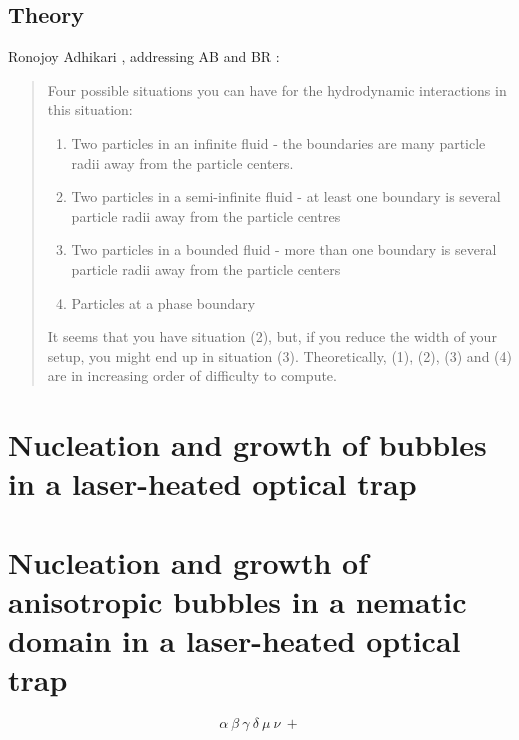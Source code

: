 \documentclass[a4paper, 11pt]{article}
\begin{document}
\subsection{Theory}

Ronojoy Adhikari , addressing AB and BR :

\begin{quotation}
  Four possible situations you can have for the hydrodynamic interactions in this situation:

  \begin{enumerate}
    \item Two particles in an infinite fluid - the boundaries are many particle radii away from the particle centers.
    \item Two particles in a semi-infinite fluid - at least one boundary is several particle radii away from the particle centres
    \item Two particles in a bounded fluid - more than one boundary is several particle radii away from the particle centers
    \item Particles at a phase boundary
  \end{enumerate}

It seems that you have situation (2), but, if you reduce the width of your setup, you might end up in situation (3). Theoretically, (1), (2), (3) and (4) are in increasing order of difficulty to compute. 
\end{quotation}


\newpage
\section{Nucleation and growth of bubbles in a laser-heated optical trap}

\section{Nucleation and growth of anisotropic bubbles in a nematic domain in a laser-heated optical trap}

\[ 
  \alpha ~ \beta ~ \gamma ~ \delta ~ \mu ~ \nu ~ +
\]




% 
% 



\end{document}
